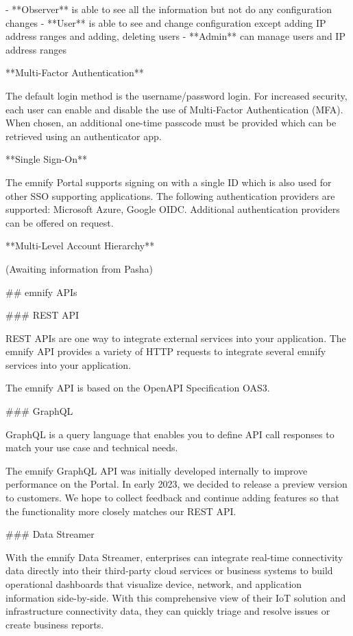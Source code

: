 \documentclass[11pt, oneside]{article}   	%
\newcommand{\addspace}{\vspace{2mm}}
\begin{document}
\addspace
\begin{markdown}
- **Observer** is able to see all the information but not do any configuration changes
- **User** is able to see and change configuration except adding IP address ranges and adding, deleting users 
- **Admin** can manage users and IP address ranges
\end{markdown}
\addspace
\begin{markdown}

**Multi-Factor Authentication**

The default login method is the username/password login.
For increased security, each user can enable and disable the use of Multi-Factor Authentication (MFA).
When chosen, an additional one-time passcode must be provided which can be retrieved using an authenticator app. 

**Single Sign-On** 

The emnify Portal supports signing on with a single ID which is also used for other SSO supporting applications. 
The following authentication providers are supported: Microsoft Azure, Google OIDC.
Additional authentication providers can be offered on request. 

**Multi-Level Account Hierarchy**

(Awaiting information from Pasha)

## emnify APIs

### REST API

REST APIs are one way to integrate external services into your application.
The emnify API provides a variety of HTTP requests to integrate several emnify services into your application.

The emnify API is based on the OpenAPI Specification OAS3.

### GraphQL

GraphQL is a query language that enables you to define API call responses to match your use case and technical needs.

The emnify GraphQL API was initially developed internally to improve performance on the Portal.
In early 2023, we decided to release a preview version to customers.
We hope to collect feedback and continue adding features so that the functionality more closely matches our REST API.

### Data Streamer

With the emnify Data Streamer, enterprises can integrate real-time connectivity data directly into their third-party cloud services or business systems to build operational dashboards that visualize device, network, and application information side-by-side.
With this comprehensive view of their IoT solution and infrastructure connectivity data, they can quickly triage and resolve issues or create business reports.


\end{markdown}
\end{document}
